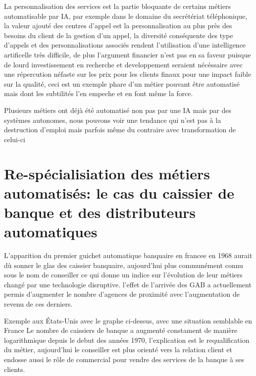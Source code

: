         La personnalisation des services est la partie bloquante de certains métiers 
        automatisable par IA, par exemple dans le domaine du secrétériat téléphonique,
        la valeur ajouté des centres d'appel est la personnalisation au plus près 
        des besoins du client de la gestion d'un appel, la diversité conséquente 
        des type d'appels et des personnalisations associés rendent l'utilisation 
        d'une intelligence artificelle très difficile, de plus l'argument financier 
        n'est pas en sa faveur puisque de lourd investissement en recherche et developpement
        seraient nécéssaire avec une répercution néfaste sur les prix pour les clients finaux 
        pour une impact faible sur la qualité, ceci est un exemple phare 
        d'un métier pouvant être automatisé mais dont les subtilités l'en empeche et 
        en font même la force.

        Plusieurs métiers ont déjà été automatisé non pas par une IA mais par des systèmes 
        autonomes, nous pouvons voir une tendance qui n'est pas à la destruction 
        d'emploi mais parfois même du contraire avec transformation de celui-ci\newline

        
        \section{Re-spécialisiation des métiers automatisés: le cas du caissier
        de banque et des distributeurs automatiques}
        
        L'apparition du premier guichet automatique banquaire en francee en 1968 
        aurait dù sonner le glas des caissier banquaire, aujourd'hui 
        plus communément connu sous le nom de conseiller ce qui donne un indice 
        sur l'évolution de leur métiers changé par une technologie disruptive.
        l'effet de l'arrivée des GAB a actuellement permis d'augmenter le 
        nombre d'agences de proximité avec l'augmentation de revenu de ces derniers.
        \newline

        Exemple aux États-Unis avec le graphe ci-dessus, avec une situation semblable en France 
        Le nombre de caissiers de banque a augmenté constament de manière 
        logarithmique depuis le debut des années 1970, l'explication est 
        le requalification du métier, aujourd'hui le conseiller 
        est plus orienté vers la relation client et endosse aussi le rôle 
        de commercial pour vendre des services de la banque à ses clients.



